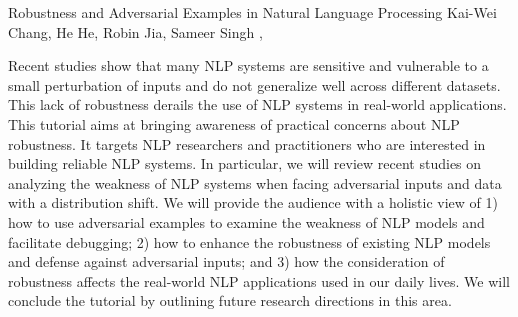 \begin{tutorial}
  {Robustness and Adversarial Examples in Natural Language Processing}
  {Kai-Wei Chang, He He, Robin Jia, Sameer Singh}
  {\daydateyear, \tutorialmorningtime}


Recent studies show that many NLP systems are sensitive and vulnerable to a small perturbation of inputs and do not generalize well across different datasets. This lack of robustness derails the use of NLP systems in real-world applications. This tutorial aims at bringing awareness of practical concerns about NLP robustness. It targets NLP researchers and practitioners who are interested in building reliable NLP systems. In particular, we will review recent studies on analyzing the weakness of NLP systems when facing adversarial inputs and data with a distribution shift. We will provide the audience with a holistic view of 1) how to use adversarial examples to examine the weakness of NLP models and facilitate debugging; 2) how to enhance the robustness of existing NLP models and defense against adversarial inputs; and 3) how the consideration of robustness affects the real-world NLP applications used in our daily lives. We will conclude the tutorial by outlining future research directions in this area.

\end{tutorial}
